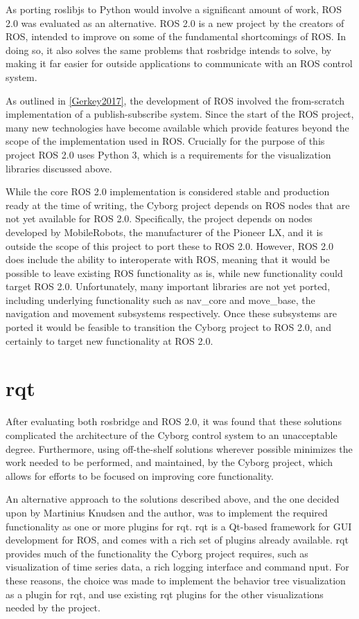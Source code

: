 \documentclass[\rootfolder/main.tex]{subfiles}
\begin{document}
As porting roslibjs to Python would involve a significant amount of work, ROS 2.0 was evaluated as an alternative.
ROS 2.0 is a new project by the creators of ROS, intended to improve on some of the fundamental shortcomings of ROS.
In doing so, it also solves the same problems that rosbridge intends to solve, by making it far easier for outside applications to communicate with an ROS control system.

As outlined in \cref{Gerkey2017}, the development of ROS involved the from-scratch implementation of a publish-subscribe system.
Since the start of the ROS project, many new technologies have become available which provide features beyond the scope of the implementation used in ROS.
Crucially for the purpose of this project ROS 2.0 uses Python 3, which is a requirements for the visualization libraries discussed above.

While the core ROS 2.0 implementation is considered stable and production ready at the time of writing, the Cyborg project depends on ROS nodes that are not yet available for ROS 2.0.
Specifically, the project depends on nodes developed by MobileRobots, the manufacturer of the Pioneer LX, and it is outside the scope of this project to port these to ROS 2.0.
However, ROS 2.0 does include the ability to interoperate with ROS, meaning that it would be possible to leave existing ROS functionality as is, while new functionality could target ROS 2.0.
Unfortunately, many important libraries are not yet ported, including underlying functionality such as nav\_core and move\_base, the navigation and movement subsystems respectively.
Once these subsystems are ported it would be feasible to transition the Cyborg project to ROS 2.0, and certainly to target new functionality at ROS 2.0.

\section{rqt}

After evaluating both rosbridge and ROS 2.0, it was found that these solutions complicated the architecture of the Cyborg control system to an unacceptable degree.
Furthermore, using off-the-shelf solutions wherever possible minimizes the work needed to be performed, and maintained, by the Cyborg project, which allows for efforts to be focused on improving core functionality.

An alternative approach to the solutions described above, and the one decided upon by Martinius Knudsen and the author, was to implement the required functionality as one or more plugins for rqt.
rqt is a Qt-based framework for GUI development for ROS, and comes with a rich set of plugins already available.
rqt provides much of the functionality the Cyborg project requires, such as visualization of time series data, a rich logging interface and command nput.
For these reasons, the choice was made to implement the behavior tree visualization as a plugin for rqt, and use existing rqt plugins for the other visualizations needed by the project.
\end{document}
